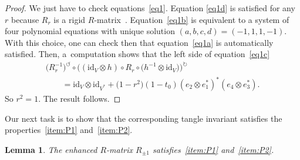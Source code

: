 \documentclass[pdftex]{sigma}
\numberwithin{equation}{section}
\newtheorem{Lemma}[Theorem]{Lemma}
\theoremstyle{definition}
\begin{document}
\begin{proof}
We just have to check equations~\eqref{eq1}. Equation \eqref{eq1d}
is satisfied for any $r$ because $R_r$ is a rigid $R$-matrix~\cite{GK:multi}.
Equation~\eqref{eq1b} is equivalent to a system of four polynomial equations
with unique solution
$(a,b,c,d) = (-1, 1, 1, -1)$.
With this choice, one can check then that equation~\eqref{eq1a} is automatically
satisfied. Then, a~computation shows that the left side of equation~\eqref{eq1c}
\begin{gather*}
\bigl(R_r^{-1}\bigr)^{\circlearrowleft} \circ \bigl((\text{id}_V \otimes h) \circ R_r
\circ \bigl(h^{-1} \otimes \text{id}_V\bigr)\bigr)^{\circlearrowright}\\
\qquad{} = \text{id}_V \otimes
\text{id}_{V^{\ast}} + \bigl(1 - r^2\bigr)(1 - t_0) (e_2 \otimes e_1^\ast)^\ast
(e_4 \otimes e_3^\ast).
\end{gather*}
So $r^2 =1$. The result follows.
\end{proof}

Our next task is to show that the corresponding tangle invariant satisfies
the properties~\eqref{item:P1} and~\eqref{item:P2}.

\begin{Lemma}\label{lem.V11}
The enhanced $R$-matrix $R_{\pm 1}$ satisfies~\eqref{item:P1} and~\eqref{item:P2}.
\end{Lemma}
\end{document}
